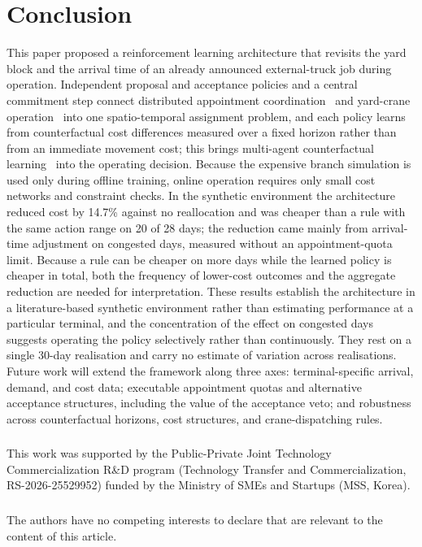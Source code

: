 \documentclass[a4paper]{llncs}
\begin{document}
\section{Conclusion}
\label{sec:concl}
This paper proposed a reinforcement learning architecture that revisits
the yard block and the arrival time of an already announced
external-truck job during operation. Independent proposal and acceptance
policies and a central commitment step connect distributed appointment
coordination~\cite{ref6} and yard-crane operation~\cite{ref7,ref8} into
one spatio-temporal assignment problem, and each policy learns from
counterfactual cost differences measured over a fixed horizon rather
than from an immediate movement cost; this brings multi-agent
counterfactual learning~\cite{ref10,ref11} into the operating decision.
Because the expensive branch simulation is used only during offline
training, online operation requires only small cost networks and
constraint checks. In the synthetic environment the architecture reduced
cost by 14.7\% against no reallocation and was cheaper than a rule with
the same action range on 20 of 28 days; the reduction came mainly from
arrival-time adjustment on congested days, measured without an
appointment-quota limit. Because a rule can be
cheaper on more days while the
learned policy is cheaper in total, both the frequency of lower-cost
outcomes and the aggregate reduction are needed for interpretation.
These results establish the architecture in a literature-based synthetic
environment rather than estimating performance at a particular terminal,
and the concentration of the effect on congested days suggests operating
the policy selectively rather than continuously. They rest on a
single 30-day realisation and carry no estimate of variation across
realisations. Future work will extend
the framework along three axes: terminal-specific arrival, demand, and
cost data; executable appointment quotas and alternative acceptance
structures, including the value of the acceptance veto; and robustness
across counterfactual horizons, cost structures, and crane-dispatching
rules.

\begin{credits}
\subsubsection{\ackname}
This work was supported by the Public-Private Joint Technology
Commercialization R\&D program (Technology Transfer and
Commercialization, RS-2026-25529952) funded by the Ministry of SMEs and
Startups (MSS, Korea).

\subsubsection{\discintname}
The authors have no competing interests to declare that are relevant to
the content of this article.
\end{credits}
\end{document}
